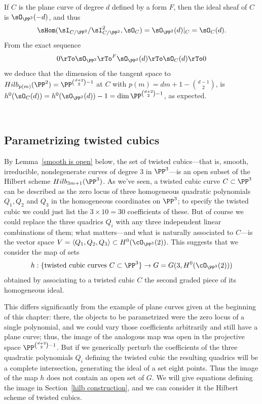 \begin{example}\label{Hilb for plane curves-continued}
If $C$ is the plane curve of degree $d$ defined by a form $F$, then the ideal sheaf of $C$ is $\sO_{\PP^2}(-d)$, and thus
$$
\sHom(\sI_{C/\PP^2}/\sI_{C/\PP^2}^2, \sO_{C}) = \sO_{\PP^2}(d)|_C = \sO_C(d).
$$
From the exact sequence 
$$
0\rTo\sO_{\PP^2}\rTo^F\sO_{\PP^2}(d) \rTo\sO_C(d)\rTo 0
$$
we deduce that the dimension of the tangent space to $Hilb_{p(m)}(\PP^2)=\PP^{\binom{d+2}{2}-1}$  at $C$
with $p(m) = dm+1-{d-1\choose 2}$,
is $h^0(\sO_C(d)) = h^0(\sO_{\PP^2}(d))-1 = \dim \PP^{\binom{d+2}{2}-1}$, as expected.
\end{example}

\

\subsection{Parametrizing twisted cubics} By Lemma~\ref{smooth is open} below, the set of twisted cubics---that is, smooth, irreducible, nondegenerate curves of degree 3 in $\PP^3$---is an open subset of the Hilbert scheme $Hilb_{3m+1}(\PP^3)$. As we've seen, a twisted cubic curve $C \subset \PP^3$ can be described as the zero locus of three homogeneous quadratic polynomials $Q_1, Q_2$ and $Q_3$ in the homogeneous coordinates on $\PP^3$; to specify the twisted cubic we could just list the $3 \times 10 = 30$ coefficients of these. But of course we could replace the three quadrics $Q_i$ with any three independent linear combinations of them; what matters---and what is naturally associated to $C$---is the vector space $V = \langle Q_1, Q_2, Q_3 \rangle \subset H^0(\cO_{\PP^3}(2))$. This suggests that we consider the map of sets
$$
h : \{ \text{twisted cubic curves } C \subset \PP^3 \} \to G = G(3, H^0(\cO_{\PP^3}(2)))
$$
obtained by associating to a twisted cubic $C$ the second graded piece of its homogeneous ideal. 

This differs significantly from the example of plane curves given at the beginning of this chapter: there, the objects to be parametrized were the zero locus of a single polynomial, and we could vary those coefficients arbitrarily and still have a plane curve; thus, the image of the analogous map was open in the projective space $\PP^{\binom{d+2}{2}-1}$. But if we generically
perturb the coefficients of the three quadratic polynomials $Q_i$ defining the twisted cubic the resulting quadrics will
be a complete intersection, generating
 the ideal of a set eight points. Thus the image of the map $h$ does not contain an open set of $G$.
We will give equations defining the image in Section~\ref{hilb construction}, and we can consider it
the Hilbert scheme of twisted cubics.

